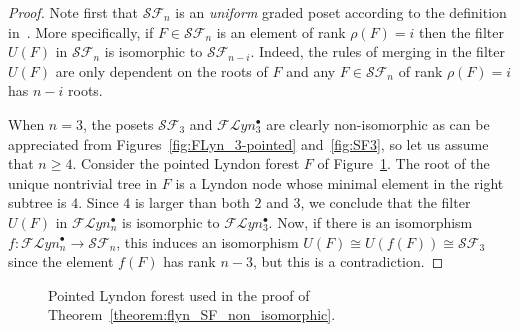 \documentclass[11pt]{article}
\theoremstyle{definition}
\numberwithin{equation}{section}
\newcommand{\Flyn}{\mathcal{FL}yn}
\newcommand{\SF}{\mathcal{SF}}
\begin{document}
\begin{proof}
Note first that $\SF_n$ is an \emph{uniform} graded poset according to the definition in~\cite{Gonzalez2016}. More specifically, if $F\in \SF_n$ is an element of rank $\rho(F)=i$ then the filter $U(F)$ in $\SF_n$ is isomorphic to $\SF_{n-i}$. Indeed, the rules of merging in the filter $U(F)$ are only dependent on the roots of $F$ and any $F\in \SF_n$ of rank $\rho(F)=i$ has $n-i$ roots.

When $n=3$, the posets $\SF_3$ and $\Flyn^\bullet_{3}$ are clearly non-isomorphic as can be appreciated from Figures~\ref{fig:FLyn_3-pointed} and~\ref{fig:SF3},  so let us assume that $n\ge 4$.
Consider the pointed Lyndon forest $F$ of Figure~\ref{fig:pointed_forest_counterexample}. The root of the unique nontrivial tree in $F$ is a Lyndon node whose minimal element in the right subtree is $4$. Since $4$ is larger than both $2$ and $3$, we conclude that the filter $U(F)$ in $\Flyn_{n}^{\bullet}$ is isomorphic to $\Flyn^\bullet_{3}$.  Now, if there is an isomorphism $f:\Flyn_{n}^{\bullet}\rightarrow \SF_n$, this induces an isomorphism $U(F)\cong U(f(F))\cong \SF_3$ since the element $f(F)$ has rank $n-3$, but this is a contradiction.
\end{proof}

    \begin{figure}
     \centering
     \caption{Pointed Lyndon forest used in the proof of Theorem~\ref{theorem:flyn_SF_non_isomorphic}.}
     \label{fig:pointed_forest_counterexample}
 \end{figure}
\end{document}
